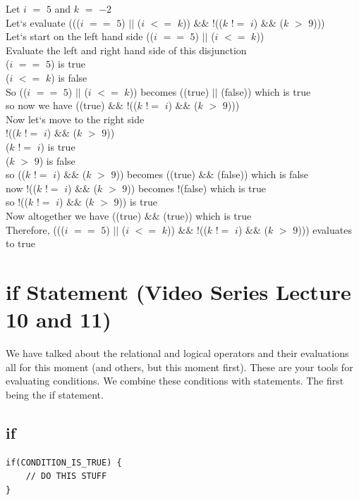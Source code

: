 \documentclass[11]{article}
\begin{document}
Let $i$ $=$ $5$ and $k$ $=$ $-2$\\
Let`s evaluate ((($i$ $==$ $5$) $||$ ($i$ $<=$ $k$)) $\&\&$ $!$(($k$ $!=$ $i$) $\&\&$ ($k$ $>$ $9$)))\\

Let`s start on the left hand side (($i$ $==$ $5$) $||$ ($i$ $<=$ $k$))\\
Evaluate the left and right hand side of this disjunction\\

($i$ $==$ $5$) is true\\
($i$ $<=$ $k$) is false\\
So (($i$ $==$ $5$) $||$ ($i$ $<=$ $k$)) becomes ((true) $||$ (false)) which is true\\

so now we have ((true) $\&\&$ $!$(($k$ $!=$ $i$) $\&\&$ ($k$ $>$ $9$)))\\

Now let`s move to the right side\\
$!$(($k$ $!=$ $i$) $\&\&$ ($k$ $>$ $9$)) \\
($k$ $!=$ $i$) is true\\
($k$ $>$ $9$) is false\\
so (($k$ $!=$ $i$) $\&\&$ ($k$ $>$ $9$)) becomes ((true) $\&\&$ (false)) which is false\\
now $!$(($k$ $!=$ $i$) $\&\&$ ($k$ $>$ $9$)) becomes $!$(false) which is true\\
so $!$(($k$ $!=$ $i$) $\&\&$ ($k$ $>$ $9$)) is true\\

Now altogether we have ((true) $\&\&$ (true)) which is true\\
Therefore, ((($i$ $==$ $5$) $||$ ($i$ $<=$ $k$)) $\&\&$ $!$(($k$ $!=$ $i$) $\&\&$ ($k$ $>$ $9$))) evaluates to true\\



\section{if Statement (Video Series Lecture 10 and 11)}
We have talked about the relational and logical operators and their evaluations all for this moment (and others, but this moment first). These are your tools for evaluating conditions. We combine these conditions with statements. The first being the if statement.\\
\subsection{if}
\begin{lstlisting}
if(CONDITION_IS_TRUE) {
    // DO THIS STUFF
}
\end{lstlisting}
\end{document}

